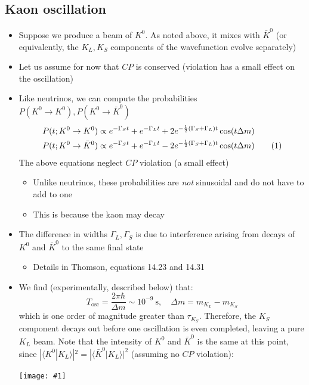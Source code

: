 \documentclass[11pt]{article}
\newcommand\numberthis{\addtocounter{equation}{1}\tag{\theequation}}
\newcommand{\ra}{\rangle}
\newcommand{\la}{\langle}
\newcommand{\s}{\text{s}}
\newcommand{\CP}{\ensuremath{CP}\xspace}
\newcommand{\embedimgw}[2]{\begin{center}\texttt{[image: \#1]}\end{center}}
\begin{document}
\subsection{Kaon oscillation}
\begin{itemize}
  \item Suppose we produce a beam of $K^0$. As noted above, it mixes with $\bar K^0$ (or equivalently, the $K_L,K_S$ components of the wavefunction evolve separately)
  \item Let us assume for now that \CP is conserved (violation has a small effect on the oscillation)
  \item Like neutrinos, we can compute the probabilities $P(K^0\rightarrow K^0), P(K^0\rightarrow \bar K^0)$
  \begin{align*}
    P(t;K^0\rightarrow K^0) &\propto e^{-\Gamma_S t} + e^{-\Gamma_L t} + 2 e^{-\frac{1}{2}(\Gamma_S+\Gamma_L)t} \cos (t \Delta m)\\
    P(t;K^0\rightarrow \bar K^0) &\propto e^{-\Gamma_S t} + e^{-\Gamma_L t} - 2 e^{-\frac{1}{2}(\Gamma_S+\Gamma_L)t} \cos (t \Delta m)\numberthis
  \end{align*}
  The above equations neglect \CP violation (a small effect)
  \begin{itemize}
    \item Unlike neutrinos, these probabilities are \emph{not} sinusoidal and do not have to add to one
    \item This is because the kaon may decay
  \end{itemize}
  \item The difference in widths $\Gamma_L,\Gamma_S$ is due to interference arising from decays of $K^0$ and $\bar K^0$ to the same final state
  \begin{itemize}
    \item Details in Thomson, equations 14.23 and 14.31
  \end{itemize}
  \item We find (experimentally, described below) that:
  \begin{equation}
    T_\text{osc} = \frac{2\pi\hbar}{\Delta m} \sim 10^{-9}~\s,\quad \Delta m = m_{K_L} - m_{K_S}
  \end{equation}
  which is one order of magnitude greater than $\tau_{K_S}$. Therefore, the $K_S$ component decays out before one oscillation is even completed, leaving a pure $K_L$ beam. Note that the intensity of $K^0$ and $\bar K^0$ is the same at this point, since $|\la K^0 | K_L \ra|^2 = |\la \bar K^0 | K_L \ra|^2$ (assuming no \CP violation):
  \embedimgw{figs/kaonosc.png}{.4}
\end{itemize}
\end{document}
